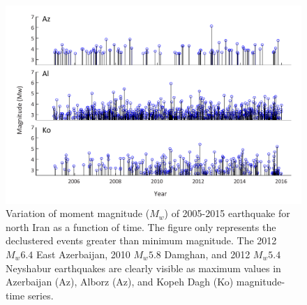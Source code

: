 \begin{figure} [ht]
\centering
\includegraphics[scale=0.8]{figures/pdf/Figure06.pdf} 
\caption{Variation of moment magnitude ($M_w$) of 2005-2015 earthquake for north Iran as a function of time. The figure only represents the declustered events greater than minimum magnitude. The 2012 $M_w 6.4$ East Azerbaijan, 2010 $M_w 5.8$ Damghan, and 2012 $M_w 5.4$ Neyshabur earthquakes are clearly visible as maximum values in Azerbaijan (Az),  Alborz (Az), and Kopeh Dagh (Ko) magnitude-time series.}
\label{fig:mag-time}
\end{figure} 

 


